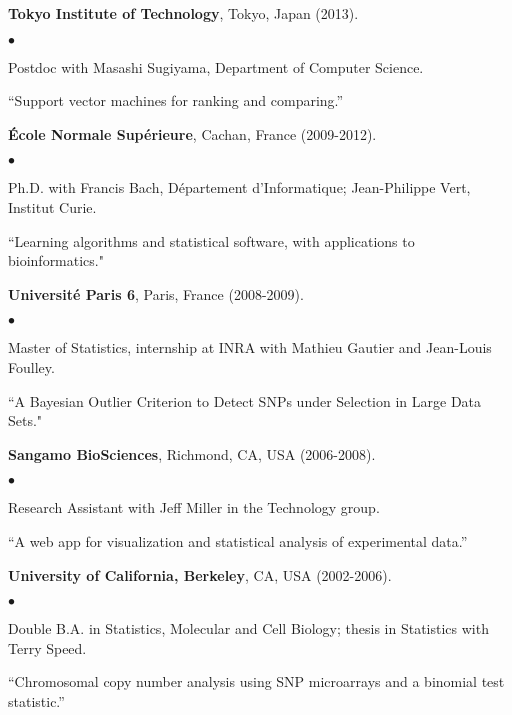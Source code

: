 \documentclass[margin,line]{res}
\newenvironment{list2}{
  \begin{list}{$\bullet$}{%
      \setlength{\itemsep}{0in}
      \setlength{\parsep}{0in} \setlength{\parskip}{0in}
      \setlength{\topsep}{0in} \setlength{\partopsep}{0in} 
      \setlength{\leftmargin}{0.2in}}}{\end{list}}
\begin{document}
\begin{resume}
{\bf Tokyo Institute of Technology}, Tokyo, Japan (2013).\\
\vspace*{-.1in}
\begin{list2}
\item[] Postdoc with Masashi Sugiyama, Department of Computer Science.
\item[] ``Support vector machines for ranking and comparing.''
\end{list2}

{\bf \'{E}cole Normale Sup\'{e}rieure}, Cachan, France (2009-2012).\\
\vspace*{-.1in}
\begin{list2}
\item[] Ph.D. with Francis Bach, D\'{e}partement d'Informatique; Jean-Philippe Vert, Institut Curie.
\item[] ``Learning algorithms and statistical software, with applications to bioinformatics."
\end{list2}

{\bf Universit\'e Paris 6}, Paris, France (2008-2009).\\
\vspace*{-.1in}
\begin{list2}
\item[] Master of Statistics, internship at INRA with Mathieu Gautier and Jean-Louis Foulley.
\item[] ``A Bayesian Outlier Criterion to Detect SNPs under Selection in Large Data Sets."
\end{list2}

{\bf Sangamo BioSciences}, Richmond, CA, USA (2006-2008).\\
\vspace*{-.1in}
\begin{list2}
\item[] Research Assistant with Jeff Miller in the Technology group.
\item[] ``A web app for visualization and statistical analysis of experimental data.''
\end{list2}

{\bf University of California, Berkeley}, CA, USA (2002-2006).\\
\vspace*{-.1in}
\begin{list2}
\item[] Double B.A. in Statistics, Molecular and Cell Biology; thesis in Statistics with Terry Speed.
\item[] ``Chromosomal copy number analysis using SNP microarrays and a binomial test statistic.'' 
\end{list2}


\end{resume}
\end{document}
